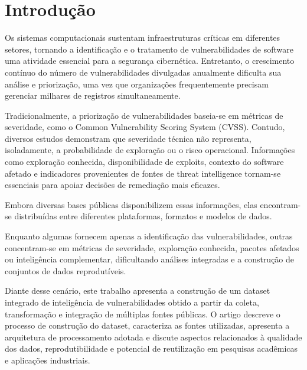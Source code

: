 \section{Introdução}

Os sistemas computacionais sustentam infraestruturas críticas em diferentes setores, tornando a identificação e o tratamento de vulnerabilidades de software uma atividade essencial para a segurança cibernética. Entretanto, o crescimento contínuo do número de vulnerabilidades divulgadas anualmente dificulta sua análise e priorização, uma vez que organizações frequentemente precisam gerenciar milhares de registros simultaneamente.

Tradicionalmente, a priorização de vulnerabilidades baseia-se em métricas de severidade, como o Common Vulnerability Scoring System (CVSS). Contudo, diversos estudos demonstram que severidade técnica não representa, isoladamente, a probabilidade de exploração ou o risco operacional. Informações como exploração conhecida, disponibilidade de exploits, contexto do software afetado e indicadores provenientes de fontes de threat intelligence tornam-se essenciais para apoiar decisões de remediação mais eficazes.

{\RaggedRight Embora diversas bases públicas disponibilizem essas informações, elas encontram-se distribuídas entre diferentes plataformas, formatos e modelos de dados.\par}

Enquanto algumas fornecem apenas a identificação das vulnerabilidades, outras concentram-se em métricas de severidade, exploração conhecida, pacotes afetados ou inteligência complementar, dificultando análises integradas e a construção de conjuntos de dados reprodutíveis.

Diante desse cenário, este trabalho apresenta a construção de um dataset integrado de inteligência de vulnerabilidades obtido a partir da coleta, transformação e integração de múltiplas fontes públicas. O artigo descreve o processo de construção do dataset, caracteriza as fontes utilizadas, apresenta a arquitetura de processamento adotada e discute aspectos relacionados à qualidade dos dados, reprodutibilidade e potencial de reutilização em pesquisas acadêmicas e aplicações industriais.
